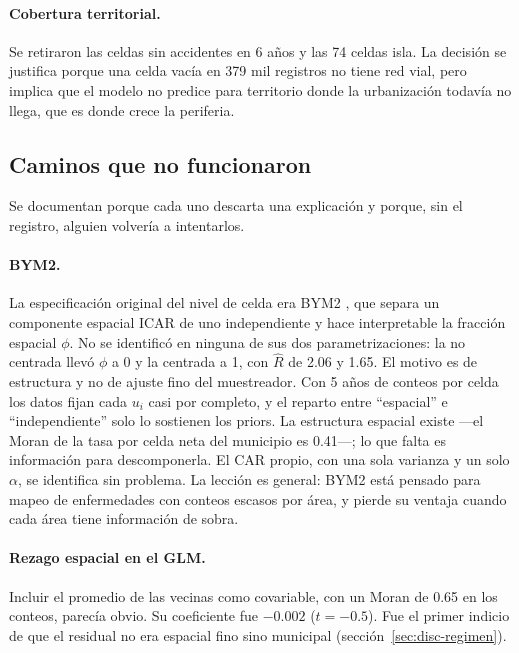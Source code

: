 \paragraph{Cobertura territorial.} Se retiraron las celdas sin accidentes en
6 años y las 74 celdas isla. La decisión se justifica porque una celda vacía
en 379 mil registros no tiene red vial, pero implica que el modelo no
predice para territorio donde la urbanización todavía no llega, que es
donde crece la periferia.

\subsection{Caminos que no funcionaron}\label{sec:disc-caminos}

Se documentan porque cada uno descarta una explicación y porque, sin el
registro, alguien volvería a intentarlos.

\paragraph{BYM2.} La especificación original del nivel de celda era BYM2
\parencite{riebler2016intuitive}, que separa un componente espacial ICAR de uno
independiente y hace interpretable la fracción espacial $\phi$. No se
identificó en ninguna de sus dos parametrizaciones: la no centrada llevó
$\phi$ a 0 y la centrada a 1, con $\hat{R}$ de 2.06 y 1.65. El motivo es de
estructura y no de ajuste fino del muestreador. Con 5 años de conteos por
celda los datos fijan cada $u_i$ casi por completo, y el reparto entre
``espacial'' e ``independiente'' solo lo sostienen los priors. La estructura
espacial existe —el Moran de la tasa por celda neta del municipio es 0.41—; lo
que falta es información para descomponerla. El CAR propio, con una sola
varianza y un solo $\alpha$, se identifica sin problema. La lección es general:
BYM2 está pensado para mapeo de enfermedades con conteos escasos por área, y
pierde su ventaja cuando cada área tiene información de sobra.

\paragraph{Rezago espacial en el GLM.} Incluir el promedio de las vecinas como
covariable, con un Moran de 0.65 en los conteos, parecía obvio. Su coeficiente
fue $-0.002$ ($t = -0.5$). Fue el primer indicio de que el residual no era
espacial fino sino municipal (sección~\ref{sec:disc-regimen}).

